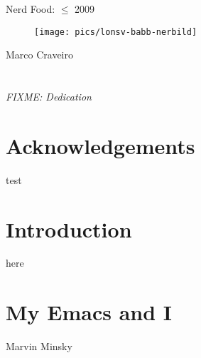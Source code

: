 \documentclass{memoir}
\begin{document}
\pagestyle{empty}
\vspace*{\fill}
\begin{center}
\HUGE\textsf{Nerd Food: $\leq$ 2009}\par
\end{center}

\begin{figure}[h]
\begin{center}
\texttt{[image: pics/lonsv-babb-nerbild]} %
\end{center}
\end{figure}

\vspace*{\fill}
\begin{center}
\Large\textsf{Marco Craveiro}\par
\end{center}

\clearpage
\pagestyle{headings}
\chapter*{}
\begin{flushright}
\emph{FIXME: Dedication}

\bigskip

\end{flushright}

\clearpage
\pagestyle{headings}
\tableofcontents

\chapter*{Acknowledgements}
\begin{epigraphs}
      {test}
\end{epigraphs}

\chapter*{Introduction}

here

\chapter{My Emacs and I}

\begin{epigraphs}
      {Marvin Minsky}
\end{epigraphs}
\end{document}
